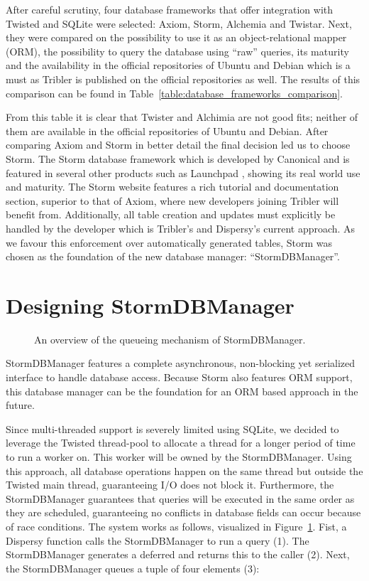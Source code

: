 After careful scrutiny, four database frameworks that offer integration with Twisted and SQLite were selected: Axiom, Storm, Alchemia and Twistar.
Next, they were compared on the possibility to use it as an object-relational mapper (ORM), the possibility to query the database using \enquote{raw} queries, its maturity and the availability in the official repositories of Ubuntu and Debian which is a must as Tribler is published on the official repositories as well.
The results of this comparison can be found in Table~\ref{table:database_frameworks_comparison}.

From this table it is clear that Twister and Alchimia are not good fits; neither of them are available in the official repositories of Ubuntu and Debian.
After comparing Axiom and Storm in better detail the final decision led us to choose Storm.
The Storm database framework which is developed by Canonical and is featured in several other products such as Launchpad \cite{canonical2011storm}, showing its real world use and maturity.
The Storm website features a rich tutorial and documentation section, superior to that of Axiom, where new developers joining Tribler will benefit from.
Additionally, all table creation and updates must explicitly be handled by the developer which is Tribler's and Dispersy's current approach.
As we favour this enforcement over automatically generated tables, Storm was chosen as the foundation of the new database manager: \enquote{StormDBManager}.

\section{Designing StormDBManager}

\begin{figure}[h]
	\caption{An overview of the queueing mechanism of StormDBManager.}
	\label{fig:storm_db_worker}
\end{figure}

StormDBManager features a complete asynchronous, non-blocking yet serialized interface to handle database access.
Because Storm also features ORM support, this database manager can be the foundation for an ORM based approach in the future.

Since multi-threaded support is severely limited using SQLite, we decided to leverage the Twisted thread-pool to allocate a thread for a longer period of time to run a worker on.
This worker will be owned by the StormDBManager.
Using this approach, all database operations happen on the same thread but outside the Twisted main thread, guaranteeing I/O does not block it.
Furthermore, the StormDBManager guarantees that queries will be executed in the same order as they are scheduled, guaranteeing no conflicts in database fields can occur because of race conditions.
The system works as follows, visualized in Figure~\ref{fig:storm_db_worker}.
Fist, a Dispersy function calls the StormDBManager to run a query (1).
The StormDBManager generates a deferred and returns this to the caller (2).
Next, the StormDBManager queues a tuple of four elements (3):

